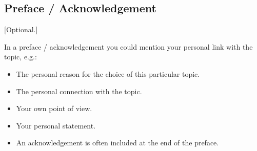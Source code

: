 \documentclass[./\jobname.tex]{subfiles}
\begin{document}
\begin{envLanguage}[english]
%
\chapter*{Preface / Acknowledgement}
[Optional.]\par
%
In a preface / acknowledgement you could mention your personal link with the topic, e.g.:
\begin{itemize}
	\item  The personal reason for the choice of this  particular topic.
	\item The personal connection with the topic.
	\item Your own point of view.
	\item Your personal statement.
	\item An acknowledgement is often included at the  end of the preface.
\end{itemize}
%
\end{envLanguage}
\end{document}
